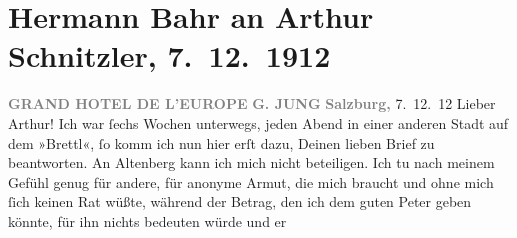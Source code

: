 

         
         \renewcommand{\erwaehntePersonen}{Personen: Peter Altenberg, Anna Bahr-Mildenburg, Georg Jung, Olga Schnitzler, Heinrich Schnitzler, Lili Schnitzler}
         \renewcommand{\erwaehnteOrte}{Orte: Grand Hotel de L’Europe, G. Jung, Salzburg, Wien}
         \renewcommand{\erwaehnteWerke}{}
               \section[Hermann Bahr an Arthur Schnitzler, 7. 12. 1912]{ Hermann Bahr an Arthur Schnitzler, 7. 12. 1912}\nopagebreak{}\rehead{ }\begin{ledgroupsized}[t]{13cm}\normalsize\beginnumbering \toendnotes[C]{\smallbreak\pagebreak[2]} 
\toendnotes[C]{\smallbreak}\pstart
           \noindent{}{\pb}\textcolor{gray}{\textbf{GRAND HOTEL DE L’EUROPE}}\pend
           \pstart
           \textcolor{gray}{\textbf{G. JUNG}}\pend
           \pstart
           \raggedleft{}\textcolor{gray}{\textbf{Salzburg, }}{ }7. 12. 12\pend
           \pstart\center{}Lieber Arthur!\pend\pstart
           Ich war ſechs Wochen unterwegs, jeden Abend in einer anderen Stadt auf dem »Brettl«,
               ſo komm ich nun hier erſt dazu, Deinen lieben Brief zu beantworten. An Altenberg kann ich mich nicht beteiligen. Ich tu
               nach meinem Gefühl genug für andere, für anonyme Armut, die mich braucht und ohne
               mich ſich keinen Rat wüßte, während der Betrag, den ich dem guten Peter geben könnte, für ihn nichts bedeuten würde und er

\end{ledgroupsized}
